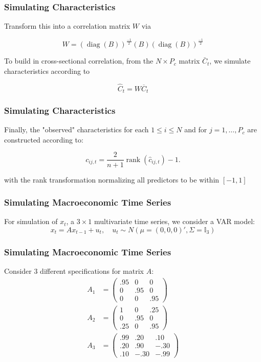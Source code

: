 \documentclass[]{beamer}
\begin{document}
\begin{frame}
\frametitle{Simulating Characteristics}
Transform this into a correlation matrix $W$ via

\begin{equation}
W = \left( \operatorname{diag}(B) \right) ^{\frac{-1}{2}}
(B)
\left( \operatorname{diag}(B) \right) ^{\frac{-1}{2}}
\end{equation}

To build in cross-sectional correlation, from the $N\times P_{c}$ matrix $\bar{C}_t$, we simulate characteristics according to

\begin{equation}
\widehat{C}_{t}=W\overline{C}_{t}
\end{equation}
\end{frame}

\begin{frame}
\frametitle{Simulating Characteristics}

Finally, the "observed" characteristics for each $1\leq i\leq N$ and for $j=1, \dots, P_{c}$ are constructed according to:

\begin{equation}
c_{i j, t} = \frac{2}{n+1} \operatorname{rank}\left(\hat{c}_{i j, t}\right) - 1.
\end{equation}

with the rank transformation normalizing all predictors to be within $[-1, 1]$ 
\end{frame}

\begin{frame}
\frametitle{Simulating Macroeconomic Time Series}
For simulation of $x_{t}$, a $3 \times 1$ multivariate time series, we consider a VAR model:
\begin{equation}
x_{t}=Ax_{t-1}+u_t, 
\quad u_t \sim N\left( \mu = (0, 0, 0)' , \Sigma = \mathbb{I}_{3}
\right)
\end{equation}
\end{frame}

\begin{frame}
\frametitle{Simulating Macroeconomic Time Series}
Consider 3 different specifications for matrix $A$:
\begin{align}
A_1 &=
	\begin{pmatrix}
	.95 & 0 & 0 \\
	0 & .95 & 0 \\
	0 & 0 & .95
	\end{pmatrix} \\
A_2 &=
	\begin{pmatrix}
	1 & 0 & .25 \\
	0 & .95 & 0 \\
	.25 & 0 &.95
	\end{pmatrix} \\
A_3 &=
	\begin{pmatrix}
	.99 & .20 & .10 \\
	.20 & .90 & -.30 \\
	.10 & -.30 & -.99
	\end{pmatrix}
\end{align}
\end{frame}
\end{document}

